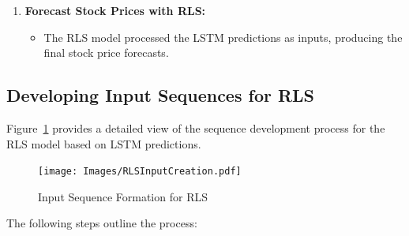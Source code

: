 \begin{enumerate}
    \item \textbf{Forecast Stock Prices with RLS:}
    \begin{itemize}
        \item The RLS model processed the LSTM predictions as inputs, producing the final stock price forecasts.
    \end{itemize}
    
\end{enumerate}

\subsection{Developing Input Sequences for RLS}

Figure~\ref{fig:inputseq} provides a detailed view of the sequence development process for the RLS model based on LSTM predictions.

\begin{figure}[htbp]
    \centering
    \texttt{[image: Images/RLSInputCreation.pdf]} %
    \caption{Input Sequence Formation for RLS}
    \label{fig:inputseq}
\end{figure}

The following steps outline the process:

